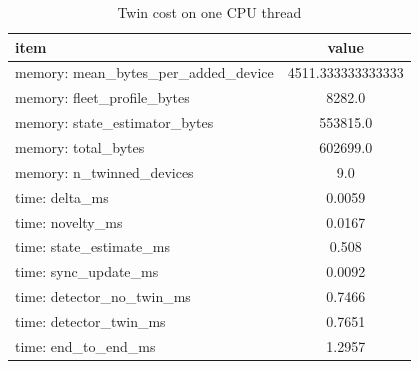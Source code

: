 \begin{table}[htbp]
\centering
\caption{Twin cost on one CPU thread}
\label{tab:twin_cost}
\begin{tabular}{lc}
\toprule
item & value \\
\midrule
memory: mean\_bytes\_per\_added\_device & 4511.333333333333 \\
memory: fleet\_profile\_bytes & 8282.0 \\
memory: state\_estimator\_bytes & 553815.0 \\
memory: total\_bytes & 602699.0 \\
memory: n\_twinned\_devices & 9.0 \\
time: delta\_ms & 0.0059 \\
time: novelty\_ms & 0.0167 \\
time: state\_estimate\_ms & 0.508 \\
time: sync\_update\_ms & 0.0092 \\
time: detector\_no\_twin\_ms & 0.7466 \\
time: detector\_twin\_ms & 0.7651 \\
time: end\_to\_end\_ms & 1.2957 \\
\bottomrule
\end{tabular}
\end{table}